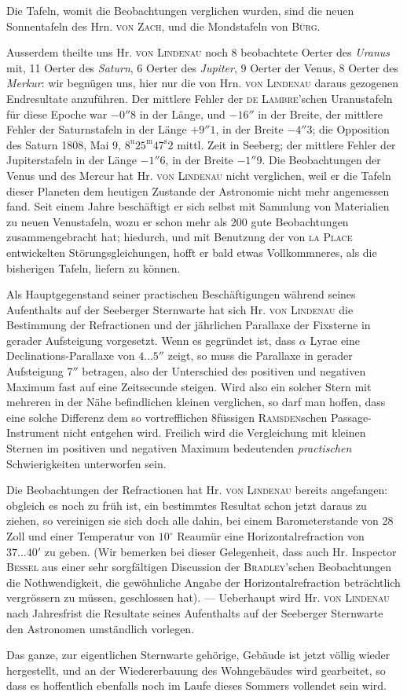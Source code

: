 Die Tafeln, womit die Beobachtungen verglichen wurden, sind die neuen Sonnentafeln des Hrn. \textsc{von Zach}, und die Mondstafeln von \textsc{Bürg}.

Ausserdem theilte uns Hr. \textsc{von Lindenau} noch 8 beobachtete Oerter des \emph{Uranus} mit, 11 Oerter des \emph{Saturn}, 6 Oerter des \emph{Jupiter}, 9 Oerter der Venus, 8 Oerter des \emph{Merkur}: wir begnügen uns, hier nur die von Hrn. \textsc{von Lindenau} daraus gezogenen Endresultate anzuführen. Der mittlere Fehler der \textsc{de Lambre}'schen Uranustafeln für diese Epoche war $-0''8$ in der Länge, und $-16''$ in der Breite, der mittlere Fehler der Saturnstafeln in der Länge $+9''1$, in der Breite $-4''3$; die Opposition des Saturn 1808, Mai 9, $8^{\mathrm{u}}25^{\mathrm{m}}47^{\mathrm{s}}2$ mittl. Zeit in Seeberg; der mittlere Fehler der Jupiterstafeln in der Länge $-1''6$, in der Breite $-1''9$. Die Beobachtungen der Venus und des Mercur hat Hr. \textsc{von Lindenau} nicht verglichen, weil er die Tafeln dieser Planeten dem heutigen Zustande der Astronomie nicht mehr angemessen fand. Seit einem Jahre beschäftigt er sich selbst mit Sammlung von Materialien zu neuen Venustafeln, wozu er schon mehr als 200 gute Beobachtungen zusammengebracht hat; hiedurch, und mit Benutzung der von \textsc{la Place} entwickelten Störungsgleichungen, hofft er bald etwas Vollkommneres, als die bisherigen Tafeln, liefern zu können.

Als Hauptgegenstand seiner practischen Beschäftigungen während seines Aufenthalts auf der Seeberger Sternwarte hat sich Hr. \textsc{von Lindenau} die Bestimmung der Refractionen und der jährlichen Parallaxe der Fixsterne in gerader Aufsteigung vorgesetzt. Wenn es gegründet ist, dass $\alpha$ Lyrae eine Declinations-Parallaxe von $4\ldots5''$ zeigt, so muss die Parallaxe in gerader Aufsteigung $7''$ betragen, also der Unterschied des positiven und negativen Maximum fast auf eine Zeitsecunde steigen. Wird also ein solcher Stern mit mehreren in der Nähe befindlichen kleinen verglichen, so darf man hoffen, dass eine solche Differenz dem so vortrefflichen 8füssigen \textsc{Ramsden}schen Passage-Instrument nicht entgehen wird. Freilich wird die Vergleichung mit kleinen Sternen im positiven und negativen Maximum bedeutenden \emph{practischen} Schwierigkeiten unterworfen sein.

Die Beobachtungen der Refractionen hat Hr. \textsc{von Lindenau} bereits angefangen: obgleich es noch zu früh ist, ein bestimmtes Resultat schon jetzt daraus zu ziehen, so vereinigen sie sich doch alle dahin, bei einem Barometerstande von 28 Zoll und einer Temperatur von $10^{\circ}$ Reaumür eine Horizontalrefraction von $37\ldots40'$ zu geben. (Wir bemerken bei dieser Gelegenheit, dass auch Hr. Inspector \textsc{Bessel} aus einer sehr sorgfältigen Discussion der \textsc{Bradley}'schen Beobachtungen die Nothwendigkeit, die gewöhnliche Angabe der Horizontalrefraction beträchtlich vergrössern zu müssen, geschlossen hat). — Ueberhaupt wird Hr. \textsc{von Lindenau} nach Jahresfrist die Resultate seines Aufenthalts auf der Seeberger Sternwarte den Astronomen umständlich vorlegen.

Das ganze, zur eigentlichen Sternwarte gehörige, Gebäude ist jetzt völlig wieder hergestellt, und an der Wiedererbauung des Wohngebäudes wird gearbeitet, so dass es hoffentlich ebenfalls noch im Laufe dieses Sommers vollendet sein wird.
